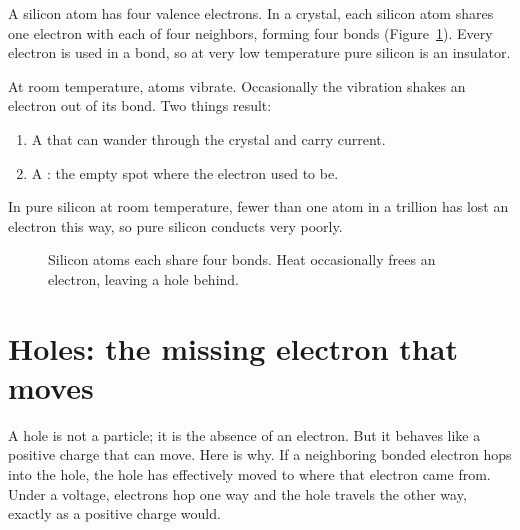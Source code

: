 A silicon atom has four valence electrons. In a crystal, each silicon atom shares one electron with each of four neighbors, forming four bonds (Figure~\ref{fig:silattice}). Every electron is used in a bond, so at very low temperature pure silicon is an insulator.

At room temperature, atoms vibrate. Occasionally the vibration shakes an electron out of its bond. Two things result:
\begin{enumerate}
  \item A  that can wander through the crystal and carry current.
  \item A : the empty spot where the electron used to be.
\end{enumerate}
In pure silicon at room temperature, fewer than one atom in a trillion has lost an electron this way, so pure silicon conducts very poorly.

\begin{figure}[h]
\centering
{}
\caption{Silicon atoms each share four bonds. Heat occasionally frees an electron, leaving a hole behind.}
\label{fig:silattice}
\end{figure}

\section{Holes: the missing electron that moves}

A hole is not a particle; it is the absence of an electron. But it behaves like a positive charge that can move. Here is why. If a neighboring bonded electron hops into the hole, the hole has effectively moved to where that electron came from. Under a voltage, electrons hop one way and the hole travels the other way, exactly as a positive charge would.

